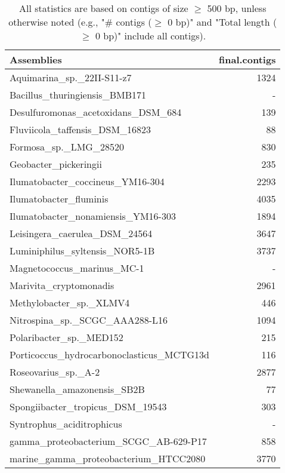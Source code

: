 \documentclass[12pt,a4paper]{article}
\begin{document}
\begin{table}[ht]
\begin{center}
\caption{All statistics are based on contigs of size $\geq$ 500 bp, unless otherwise noted (e.g., "\# contigs ($\geq$ 0 bp)" and "Total length ($\geq$ 0 bp)" include all contigs).}
\begin{tabular}{|l*{1}{|r}|}
\hline
Assemblies & final.contigs \\ \hline
Aquimarina\_sp.\_22II-S11-z7 & 1324 \\ \hline
Bacillus\_thuringiensis\_BMB171 & - \\ \hline
Desulfuromonas\_acetoxidans\_DSM\_684 & 139 \\ \hline
Fluviicola\_taffensis\_DSM\_16823 & 88 \\ \hline
Formosa\_sp.\_LMG\_28520 & 830 \\ \hline
Geobacter\_pickeringii & 235 \\ \hline
Ilumatobacter\_coccineus\_YM16-304 & 2293 \\ \hline
Ilumatobacter\_fluminis & 4035 \\ \hline
Ilumatobacter\_nonamiensis\_YM16-303 & 1894 \\ \hline
Leisingera\_caerulea\_DSM\_24564 & 3647 \\ \hline
Luminiphilus\_syltensis\_NOR5-1B & 3737 \\ \hline
Magnetococcus\_marinus\_MC-1 & - \\ \hline
Marivita\_cryptomonadis & 2961 \\ \hline
Methylobacter\_sp.\_XLMV4 & 446 \\ \hline
Nitrospina\_sp.\_SCGC\_AAA288-L16 & 1094 \\ \hline
Polaribacter\_sp.\_MED152 & 215 \\ \hline
Porticoccus\_hydrocarbonoclasticus\_MCTG13d & 116 \\ \hline
Roseovarius\_sp.\_A-2 & 2877 \\ \hline
Shewanella\_amazonensis\_SB2B & 77 \\ \hline
Spongiibacter\_tropicus\_DSM\_19543 & 303 \\ \hline
Syntrophus\_aciditrophicus & - \\ \hline
gamma\_proteobacterium\_SCGC\_AB-629-P17 & 858 \\ \hline
marine\_gamma\_proteobacterium\_HTCC2080 & 3770 \\ \hline
\end{tabular}
\end{center}
\end{table}
\end{document}
